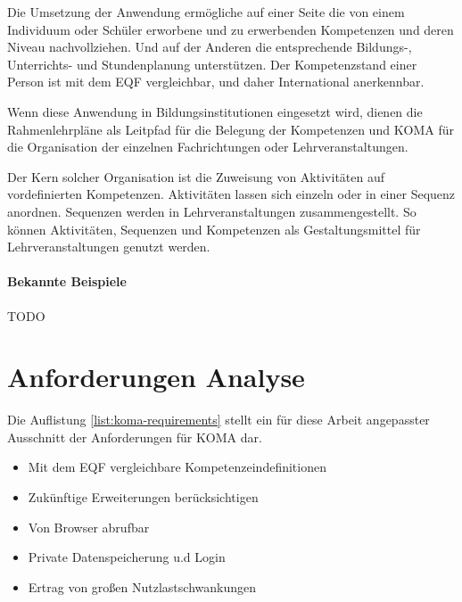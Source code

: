 \documentclass[
12pt,
english,
ngerman,
headsepline,
twoside,
openright,
numbers=noenddot,version=first
]{scrreprt}
\begin{document}
Die Umsetzung der Anwendung ermögliche auf einer Seite die von einem Individuum oder Schüler
erworbene und zu erwerbenden Kompetenzen und deren Niveau nachvollziehen. Und auf der Anderen die entsprechende Bildungs-, Unterrichts- und Stundenplanung unterstützen.
Der Kompetenzstand einer Person ist mit dem \acrshort{EQF} vergleichbar, und daher International anerkennbar.

Wenn diese Anwendung in Bildungsinstitutionen eingesetzt wird, dienen die Rahmenlehrpläne als Leitpfad für die Belegung der Kompetenzen und \acrshort{KOMA} für die Organisation der einzelnen Fachrichtungen oder Lehrveranstaltungen. 

Der Kern solcher Organisation ist die Zuweisung von Aktivitäten auf vordefinierten Kompetenzen. Aktivitäten lassen sich einzeln oder in einer Sequenz anordnen. Sequenzen werden in Lehrveranstaltungen zusammengestellt. So können Aktivitäten, Sequenzen und Kompetenzen als Gestaltungsmittel für Lehrveranstaltungen genutzt werden. 

\paragraph{Bekannte Beispiele}
TODO

\section{Anforderungen Analyse}
Die Auflistung \ref{list:koma-requirements} stellt ein für diese Arbeit angepasster Ausschnitt der Anforderungen für \acrshort{KOMA} dar.

\begin{itemize}\label{list:koma-requirements}
	\item Mit dem \acrshort{EQF} vergleichbare Kompetenzeindefinitionen
	\item Zukünftige Erweiterungen berücksichtigen
	\item Von Browser abrufbar
	\item Private Datenspeicherung u.d Login
	\item Ertrag von großen Nutzlastschwankungen
\end{itemize}
\end{document}
